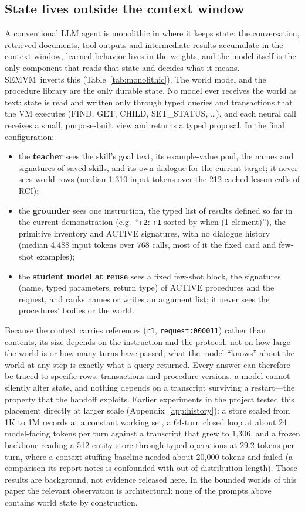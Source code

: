 \documentclass[10pt]{article}
\newcommand{\id}[1]{\nolinkurl{#1}}
\newcommand{\semvm}{SEMVM}
\begin{document}
\subsection{State lives outside the context window}\label{sec:querystate}
A conventional LLM agent is monolithic in where it keeps state: the conversation, retrieved documents, tool outputs and intermediate results accumulate in the context window, learned behavior lives in the weights, and the model itself is the only component that reads that state and decides what it means. \semvm\ inverts this (Table~\ref{tab:monolithic}). The world model and the procedure library are the only durable state. No model ever receives the world as text: state is read and written only through typed queries and transactions that the VM executes (FIND, GET, CHILD, SET\_STATUS, \dots), and each neural call receives a small, purpose-built view and returns a typed proposal. In the final configuration:
\begin{itemize}
\item the \textbf{teacher} sees the skill's goal text, its example-value pool, the names and signatures of saved skills, and its own dialogue for the current target; it never sees world rows (median 1{,}310 input tokens over the 212 cached lesson calls of RCI);
\item the \textbf{grounder} sees one instruction, the typed list of results defined so far in the current demonstration (e.g.\ ``\id{r2}: \id{r1} sorted by when (1 element)''), the primitive inventory and ACTIVE signatures, with no dialogue history (median 4{,}488 input tokens over 768 calls, most of it the fixed card and few-shot examples);
\item the \textbf{student model at reuse} sees a fixed few-shot block, the signatures (name, typed parameters, return type) of ACTIVE procedures and the request, and ranks names or writes an argument list; it never sees the procedures' bodies or the world.
\end{itemize}
Because the context carries references (\id{r1}, \id{request:000011}) rather than contents, its size depends on the instruction and the protocol, not on how large the world is or how many turns have passed; what the model ``knows'' about the world at any step is exactly what a query returned. Every answer can therefore be traced to specific rows, transactions and procedure versions, a model cannot silently alter state, and nothing depends on a transcript surviving a restart---the property that the handoff exploits. Earlier experiments in the project tested this placement directly at larger scale (Appendix~\ref{app:history}): a store scaled from 1K to 1M records at a constant working set, a 64-turn closed loop at about 24 model-facing tokens per turn against a transcript that grew to 1{,}306, and a frozen backbone reading a 512-entity store through typed operations at 29.2 tokens per turn, where a context-stuffing baseline needed about 20{,}000 tokens and failed (a comparison its report notes is confounded with out-of-distribution length). Those results are background, not evidence released here. In the bounded worlds of this paper the relevant observation is architectural: none of the prompts above contains world state by construction.
\end{document}

